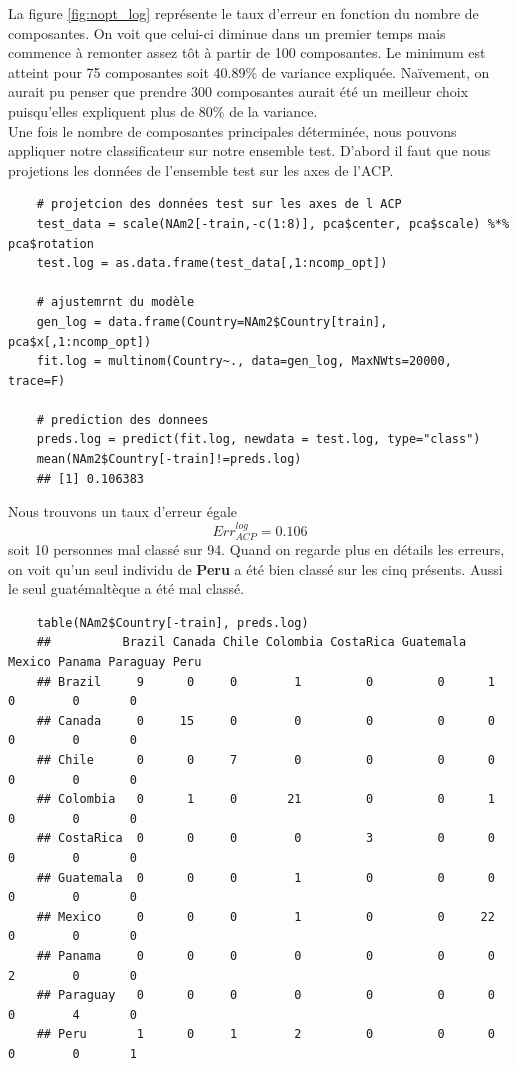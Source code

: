 \documentclass[12pt,a4paper]{article}
\begin{document}
La figure \ref{fig:nopt_log} représente le taux d'erreur en fonction du nombre de composantes. On voit que celui-ci diminue dans un premier temps mais commence à remonter assez tôt à partir de 100 composantes. Le minimum est atteint pour 75 composantes soit 40.89\% de variance expliquée. Naïvement, on aurait pu penser que prendre 300 composantes aurait été un meilleur choix puisqu'elles expliquent plus de 80\% de la variance.\vspace{3mm}\\
Une fois le nombre de composantes principales déterminée, nous pouvons appliquer notre classificateur sur notre ensemble test. D'abord il faut que nous projetions les données de l'ensemble test sur les axes de l'ACP.
\begin{lstlisting}
	# projetcion des données test sur les axes de l ACP
	test_data = scale(NAm2[-train,-c(1:8)], pca$center, pca$scale) %*% pca$rotation
	test.log = as.data.frame(test_data[,1:ncomp_opt])
	
	# ajustemrnt du modèle
	gen_log = data.frame(Country=NAm2$Country[train], pca$x[,1:ncomp_opt])
	fit.log = multinom(Country~., data=gen_log, MaxNWts=20000, trace=F)
	
	# prediction des donnees
	preds.log = predict(fit.log, newdata = test.log, type="class")
	mean(NAm2$Country[-train]!=preds.log)
	## [1] 0.106383
\end{lstlisting}
Nous trouvons un taux d'erreur égale \[Err_{ACP}^{log} = 0.106\] soit 10 personnes mal classé sur 94. Quand on regarde plus en détails les erreurs, on voit qu'un seul individu de \textbf{Peru} a été bien classé sur les cinq présents. Aussi le seul guatémaltèque a été mal classé.
\begin{lstlisting}
	table(NAm2$Country[-train], preds.log)
	## 			Brazil Canada Chile Colombia CostaRica Guatemala Mexico Panama Paraguay Peru
	## Brazil     9      0     0        1         0         0      1      0        0       0
	## Canada     0     15     0        0         0         0      0      0        0       0
	## Chile      0      0     7        0         0         0      0      0        0       0
	## Colombia   0      1     0       21         0         0      1      0        0       0
	## CostaRica  0      0     0        0         3         0      0      0        0       0
	## Guatemala  0      0     0        1         0         0      0      0        0       0
	## Mexico     0      0     0        1         0         0     22      0        0       0
	## Panama     0      0     0        0         0         0      0      2        0       0
	## Paraguay   0      0     0        0         0         0      0      0        4       0
	## Peru       1      0     1        2         0         0      0      0        0       1
\end{lstlisting}
\end{document}
